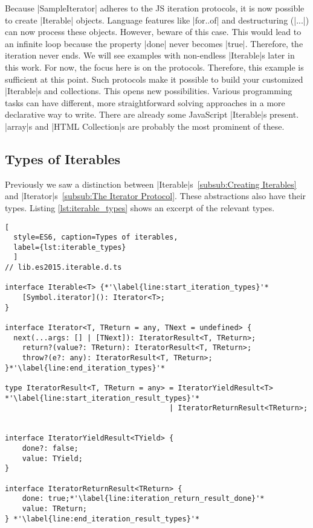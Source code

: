 Because |SampleIterator| adheres to the JS iteration protocols, it is now 
possible to create |Iterable| objects. Language features like |for..of| and 
destructuring (|...|) can now process these objects. However, beware of this 
case. This would lead to an infinite loop because the property |done| never 
becomes |true|. Therefore, the iteration never ends. We will see examples 
with non-endless |Iterable|s later in this work. 
For now, the focus here is on the protocols. Therefore, this 
example is sufficient at this point.
\newline
Such protocols make it possible to build your customized |Iterable|s and
collections. This opens new possibilities. Various programming tasks can have 
different, more straightforward solving approaches in a more declarative way to
write.
There are already some JavaScript |Iterable|s present. |array|s and
|HTML Collection|s are probably the most prominent of these.

\subsection{Types of Iterables}
\label{sub:Types of Iterables}
Previously we saw a distinction between 
|Iterable|s~\ref{subsub:Creating Iterables} and 
|Iterator|s~\ref{subsub:The Iterator Protocol}. These abstractions also have their 
types. Listing \ref{lst:iterable_types} shows an excerpt of the relevant types.

\begin{lstlisting}[
  style=ES6, caption=Types of iterables,
  label={lst:iterable_types}
  ]
// lib.es2015.iterable.d.ts

interface Iterable<T> {*'\label{line:start_iteration_types}'*
    [Symbol.iterator](): Iterator<T>;
}

interface Iterator<T, TReturn = any, TNext = undefined> {
  next(...args: [] | [TNext]): IteratorResult<T, TReturn>;
    return?(value?: TReturn): IteratorResult<T, TReturn>;
    throw?(e?: any): IteratorResult<T, TReturn>;
}*'\label{line:end_iteration_types}'*

type IteratorResult<T, TReturn = any> = IteratorYieldResult<T> *'\label{line:start_iteration_result_types}'*
                                      | IteratorReturnResult<TReturn>;


interface IteratorYieldResult<TYield> {
    done?: false;
    value: TYield;
}

interface IteratorReturnResult<TReturn> {
    done: true;*'\label{line:iteration_return_result_done}'*
    value: TReturn;
} *'\label{line:end_iteration_result_types}'*
\end{lstlisting}

